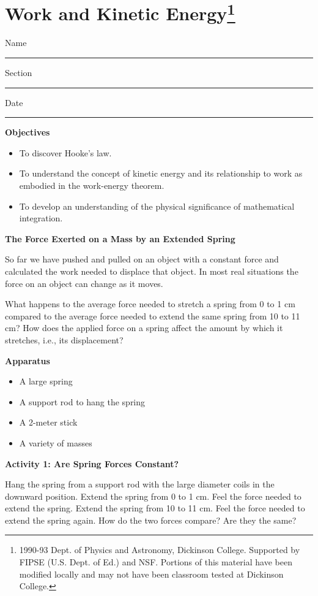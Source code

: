 
\section{Work and Kinetic Energy\footnote{
1990-93 Dept. of Physics and Astronomy, Dickinson College. Supported by FIPSE
(U.S. Dept. of Ed.) and NSF. Portions of this material have been modified locally
and may not have been classroom tested at Dickinson College.
}}

Name \rule{2.0in}{0.1pt}\hfill{}Section \rule{1.0in}{0.1pt}\hfill{}Date \rule{1.0in}{0.1pt}

\textbf{Objectives} 

\begin{itemize}
\item To discover Hooke's law. 
\item To understand the concept of kinetic energy and its relationship to work as
embodied in the work-energy theorem. 
\item To develop an understanding of the physical significance of mathematical integration.
\end{itemize}
\textbf{The Force Exerted on a Mass by an Extended Spring} 

So far we have pushed and pulled on an object with a constant force and calculated
the work needed to displace that object. In most real situations the force on
an object can change as it moves. 

What happens to the average force needed to stretch a spring from 0 to 1 cm
compared to the average force needed to extend the same spring from 10 to 11
cm? How does the applied force on a spring affect the amount by which it stretches,
i.e., its displacement?

\textbf{Apparatus }

\begin{itemize}
\item A large spring 
\item A support rod to hang the spring 
\item A 2-meter stick 
\item A variety of masses
\end{itemize}
\textbf{Activity 1: Are Spring Forces Constant?} 

Hang the spring from a support rod with the large diameter coils in the downward
position. Extend the spring from 0 to 1 cm. Feel the force needed to extend
the spring. Extend the spring from 10 to 11 cm. Feel the force needed to extend
the spring again. How do the two forces compare? Are they the same? 
\vspace{10mm}

